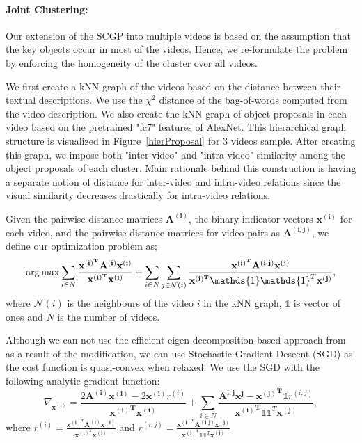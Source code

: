 \noindent\paragraph{Joint Clustering:} Our extension of the SCGP into multiple videos is based on the assumption that the key objects occur in most of the videos. Hence, we re-formulate the problem by enforcing the homogeneity of the cluster over all videos. 

We first create a kNN graph of the videos based on the distance between their textual descriptions. We use the $\chi^2$ distance of the bag-of-words computed from the video description. We also create the kNN graph of object proposals in each video based on the pretrained "fc7" features of AlexNet\cite{alexnet}. This hierarchical graph structure is visualized in Figure~\ref{hierProposal} for 3 videos sample. After creating this graph, we impose both "inter-video" and "intra-video" similarity among the object proposals of each cluster. Main rationale behind this construction is having a separate notion of distance for inter-video and intra-video relations since the visual similarity decreases drastically for intra-video relations.

Given the pairwise distance matrices $\mathbf{A^{(i)}}$, the binary indicator vectors $\mathbf{x^{(i)}}$ for each video, and the pairwise distance matrices for video pairs as $\mathbf{A^{(i,j)}}$, we define our optimization problem as;
\begin{equation}
\argmax \sum_{i \in N} \frac{\mathbf{x^{(i)^T}}\mathbf{A^{(i)}}\mathbf{x^{(i)}}}{\mathbf{x^{(i)^T}}\mathbf{x^{(i)}}} +
\sum_{i \in N} \sum_{j \in \mathcal{N}(i)} \frac{\mathbf{x^{(i)^T}}\mathbf{A^{(i,j)}}\mathbf{x^{(j)}}} {\mathbf{x^{(i)^T}}\mathds{1}\mathds{1}^T\mathbf{x^{(j)}}},
\end{equation}
where $\mathcal{N}(i)$ is the neighbours of the video $i$ in the kNN graph, $\mathds{1}$ is vector of ones and $N$ is the number of videos. 

Although we can not use the efficient eigen-decomposition based approach from \cite{scgp,scgp_eigen} as a result of the modification, we can use Stochastic Gradient Descent (SGD) as the cost function is quasi-convex when relaxed. We use the SGD with the following analytic gradient function:
\begin{equation}
  \nabla_{\mathbf{x^{(i)}}} = \frac{2\mathbf{A^{(i)}} \mathbf{x^{(i)}} -2\mathbf{x^{(i)}} r^{(i)}}
  {\mathbf{{x^{(i)}}^T}\mathbf{x^{(i)}}}
+ \sum_{i \in N} \frac{\mathbf{A^{i,j}}\mathbf{x^{j}} - \mathbf{{x^{(j)}}^T} \mathds{1} r^{(i,j)}}{\mathbf{{x^{(i)}}^T} \mathds{1} \mathds{1}^T \mathbf{x^{(j)}} },
\end{equation}
where $r^{(i)}=\frac{\mathbf{x^{(i)^T}}\mathbf{A^{(i)}}\mathbf{x^{(i)}}}{\mathbf{x^{(i)^T}}\mathbf{x^{(i)}}}$ and $r^{(i,j)}=\frac{\mathbf{x^{(i)^T}}\mathbf{A^{(i,j)}}\mathbf{x^{(j)}}} {\mathbf{x^{(i)^T}}\mathds{1}\mathds{1}^T\mathbf{x^{(j)}}}$

